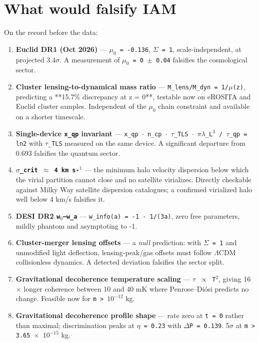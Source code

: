 \documentclass[12pt,a4paper]{article}
\begin{document}
\section{What would falsify IAM}

On the record before the data:


\begin{enumerate}\setlength\itemsep{2pt}
  \item \textbf{Euclid DR1 (Oct 2026)} --- \texttt{$\mu_{0}$ = -0.136}, \texttt{$\Sigma$ = 1}, scale-independent, at projected 3.4$\sigma$. A measurement of \texttt{$\mu_{0}$ = 0 $\pm$ 0.04} falsifies the cosmological sector.
  \item \textbf{Cluster lensing-to-dynamical mass ratio} --- \texttt{M\_lens/M\_dyn = 1/$\mu$(z)}, predicting a **15.7\% discrepancy at z = 0**, testable now on eROSITA and Euclid cluster samples. Independent of the \texttt{$\mu_{0}$} chain constraint and available on a shorter timescale.
  \item \textbf{Single-device \texttt{x\_qp} invariant} --- \texttt{x\_qp $\cdot$ n\_cp $\cdot$ $\tau$\_TLS $\cdot$ $\pi\lambda$\_L$^{3}$ / $\tau$\_qp = ln2} with \texttt{$\tau$\_TLS} measured on the same device. A significant departure from 0.693 falsifies the quantum sector.
  \item \textbf{\texttt{$\sigma$\_crit $\approx$ 4 km s-$^{1}$}} --- the minimum halo velocity dispersion below which the virial partition cannot close and no satellite virializes. Directly checkable against Milky Way satellite dispersion catalogues; a confirmed virialized halo well below 4 km/s falsifies it.
  \item \textbf{DESI DR2 \texttt{w$_{0}$--w\_a}} --- \texttt{w\_info(a) = -1 - 1/(3a)}, zero free parameters, mildly phantom and asymptoting to -1.
  \item \textbf{Cluster-merger lensing offsets} --- a \textit{null} prediction: with \texttt{$\Sigma$ = 1} and unmodified light deflection, lensing-peak/gas offsets must follow $\Lambda$CDM collisionless dynamics. A detected deviation falsifies the sector split.
  \item \textbf{Gravitational decoherence temperature scaling} --- \texttt{$\tau$ $\propto$ T$^{2}$}, giving 16$\times$ longer coherence between 10 and 40 mK where Penrose--Di\'osi predicts no change. Feasible now for \texttt{m > $10^{-12}$} kg.
  \item \textbf{Gravitational decoherence profile shape} --- rate zero at \texttt{t = 0} rather than maximal; discrimination peaks at \texttt{$\eta$ = 0.23} with \texttt{$\Delta$P = 0.139}. 5$\sigma$ at \texttt{m > 3.65 $\times$ $10^{-15}$} kg.

\end{enumerate}
\end{document}
